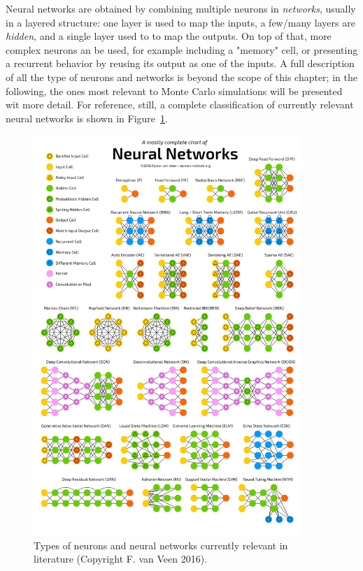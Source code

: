 Neural networks are obtained by combining multiple neurons in \emph{networks}, usually in a layered structure: one layer is used to map the inputs, a few/many layers are \emph{hidden}, and a single layer used to to map the outputs. On top of that, more complex neurons an be used, for example including a "memory" cell, or presenting a recurrent behavior by reusing its output as one of the inputs. A full description of all the type of neurons and networks is beyond the scope of this chapter; in the following, the ones most relevant to Monte Carlo simulations will be presented wit more detail. For reference, still, a complete classification of currently relevant neural networks is shown in Figure~\ref{fig:types}.
\begin{figure}[h]
    \centering
    \includegraphics[width=0.9\textwidth]{images/types.png}
    \caption{Types of neurons and neural networks currently relevant in literature (Copyright F. van Veen 2016).}
    \label{fig:types}
\end{figure}
